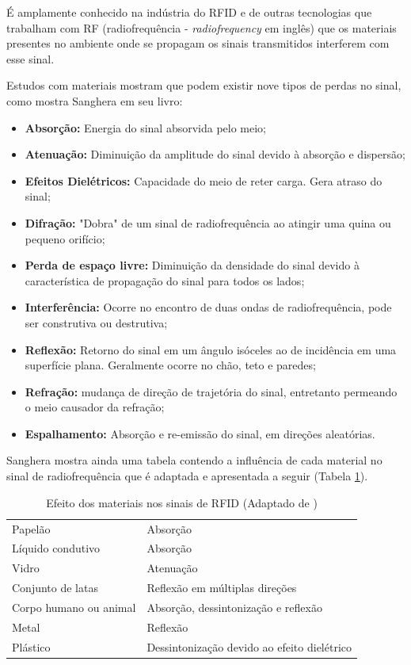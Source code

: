 É amplamente conhecido na indústria do RFID e de outras tecnologias que trabalham com RF (radiofrequência - \textit{radiofrequency} em inglês) que os materiais presentes no ambiente onde se propagam os sinais transmitidos interferem com esse sinal.

Estudos com materiais mostram que podem existir nove tipos de perdas no sinal, como mostra Sanghera em seu livro\cite{book:SangheraRFID+}:
\begin{itemize}
    \item \textbf{Absorção:} Energia do sinal absorvida pelo meio;
    \item \textbf{Atenuação:} Diminuição da amplitude do sinal devido à absorção e dispersão;
    \item \textbf{Efeitos Dielétricos:} Capacidade do meio de reter carga. Gera atraso do sinal;
    \item \textbf{Difração:} "Dobra" de um sinal de radiofrequência ao atingir uma quina ou pequeno orifício;
    \item \textbf{Perda de espaço livre:} Diminuição da densidade do sinal devido à característica de propagação do sinal para todos os lados;
    \item \textbf{Interferência:} Ocorre no encontro de duas ondas de radiofrequência, pode ser construtiva ou destrutiva;
    \item \textbf{Reflexão:} Retorno do sinal em um ângulo isóceles ao de incidência em uma superfície plana. Geralmente ocorre no chão, teto e paredes;
    \item \textbf{Refração:} mudança de direção de trajetória do sinal, entretanto permeando o meio causador da refração;
    \item \textbf{Espalhamento:} Absorção e re-emissão do sinal, em direções aleatórias.
\end{itemize}
    
Sanghera mostra ainda uma tabela contendo a influência de cada material no sinal de radiofrequência \cite{book:SangheraRFID+} que é adaptada e apresentada a seguir (Tabela \ref{tab:InterfMateriais}).

\begin{table}[H]
\centering
\caption{Efeito dos materiais nos sinais de RFID (Adaptado de \cite{book:SangheraRFID+})}
\label{tab:InterfMateriais}
\begin{tabular}{p{5cm} p{7cm}}
\hline
\cellcolor{lightgray}{Material} & \cellcolor{lightgray}{Efeito no sinal RF}   \\ \hline
Papelão         &   Absorção        \\
Líquido condutivo    &   Absorção        \\
Vidro           &  Atenuação        \\
Conjunto de latas & Reflexão em múltiplas direções \\
Corpo humano ou animal & Absorção, dessintonização e reflexão \\ 
Metal & Reflexão \\
Plástico & Dessintonização devido ao efeito dielétrico \\ \hline
\end{tabular}
\end{table}

